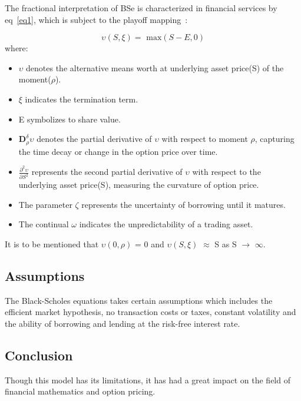 \documentclass[12pt,a4paper]{article}
\begin{document}
The fractional interpretation of BSe is characterized in financial services by eq~\ref{eq1}, which is subject to the playoff mapping~\footnotemark[2] :

\begin{equation}
    \upsilon(S,\xi) = \text{ max} (S - E,0)
    \label{eq2}
\end{equation}
where:

\begin{itemize}
\item $\upsilon$ denotes the alternative means worth at underlying asset price(S) of the moment($\rho$).
\item $\xi$ indicates the termination term.
\item E symbolizes to share value.
\item $\textbf{D}_\rho^\delta\upsilon$ denotes the partial derivative of $\upsilon$ with respect to moment $\rho$, capturing the time decay or change in the option price over time.
\item $\frac{{\partial^2\upsilon}}{\partial S^2}$ represents the second partial derivative of $\upsilon$ with respect to the underlying asset price(S), measuring the curvature of option price.
\item The parameter $\zeta$ represents the uncertainty of borrowing until it matures.
\item The continual $\omega$ indicates the unpredictability of a trading asset.
\end{itemize}


It is to be mentioned that $\upsilon(0,\rho)$ = 0 and $\upsilon(S,\xi)$ $\approx$ S as S $\rightarrow$ $\infty$. 

\subsection{Assumptions}

The Black-Scholes equations takes certain assumptions which includes the efficient market hypothesis, no transaction costs or taxes, constant volatility and the ability of borrowing and lending at the risk-free interest rate. 

\subsection{Conclusion}

Though this model has its limitations, it has had a great impact on the field of financial mathematics and option pricing. 


\end{document}
